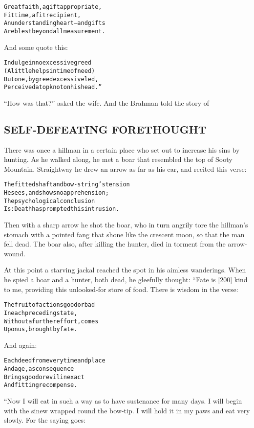 \documentclass{article}
\renewenvironment{verbatim}{\begin{alltt}\normalfont\begin{centering}}{\end{centering}\end{alltt}}
\begin{document}
\begin{verbatim}
Great faith, a gift appropriate,
    Fit time, a fit recipient,
An understanding heart--and gifts
    Are blest beyond all measurement.
\end{verbatim}
And some quote this:

\begin{verbatim}
Indulge in no excessive greed
(A little helps in time of need)
But one, by greed excessive led,
Perceived a topknot on his head.”
\end{verbatim}
``How was that?'' asked the wife. And the Brahman told the story
of

\subsection{SELF-DEFEATING FORETHOUGHT}

There was once a hillman in a certain place who set out to increase
his sins by hunting. As he walked along, he met a boar that
resembled the top of Sooty Mountain. Straightway he drew an arrow
as far as his ear, and recited this verse:

\begin{verbatim}
The fitted shaft and bow-string's tension
He sees, and shows no apprehension;
The psychological conclusion
Is: Death has prompted this intrusion.
\end{verbatim}
Then with a sharp arrow he shot the boar, who in turn angrily tore
the hillman's stomach with a pointed fang that shone like the
crescent moon, so that the man fell dead. The boar also, after
killing the hunter, died in torment from the arrow-wound.

At this point a starving jackal reached the spot in his aimless
wanderings. When he spied a boar and a hunter, both dead, he
gleefully thought: “Fate is [200] kind to me, providing this
unlooked-for store of food. There is wisdom in the verse:

\begin{verbatim}
The fruit of actions good or bad
    In each preceding state,
Without a further effort, comes
    Upon us, brought by fate.
\end{verbatim}
And again:

\begin{verbatim}
Each deed from every time and place
    And age, as consequence
Brings good or evil in exact
    And fitting recompense.
\end{verbatim}
“Now I will eat in such a way as to have sustenance for many days.
I will begin with the sinew wrapped round the bow-tip. I will hold
it in my paws and eat very slowly. For the saying goes:
\end{document}
